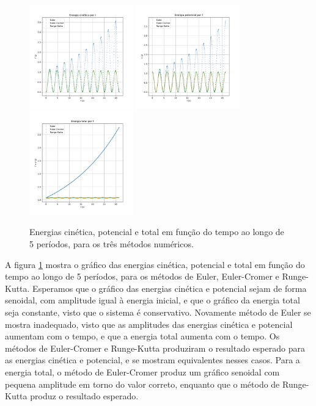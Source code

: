 \documentclass[a4paper, brazil]{article}
\begin{document}
\begin{figure}[ht]
\centering
\includegraphics[width=0.4\textwidth]{fig1c1.pdf}
\includegraphics[width=0.4\textwidth]{fig1c2.pdf}
\includegraphics[width=0.4\textwidth]{fig1c3.pdf}
\caption{Energias cinética, potencial e total em função do tempo ao longo de 5 períodos, para os três métodos numéricos.}
\label{fig1c}
\end{figure}

A figura \ref{fig1c} mostra o gráfico das energias cinética, potencial e total em função do tempo ao longo de 5 períodos, para os métodos de Euler, Euler-Cromer e Runge-Kutta.
Esperamos que o gráfico das energias cinética e potencial sejam de forma senoidal, com amplitude igual à energia inicial, e que o gráfico da energia total seja constante, visto que o sistema é conservativo.
Novamente método de Euler se mostra inadequado, visto que as amplitudes das energias cinética e potencial aumentam com o tempo, e que a energia total aumenta com o tempo.
Os métodos de Euler-Cromer e Runge-Kutta produziram o resultado esperado para as energias cinética e potencial, e se mostram equivalentes nesses casos.
Para a energia total, o método de Euler-Cromer produz um gráfico senoidal com pequena amplitude em torno do valor correto, enquanto que o método de Runge-Kutta produz o resultado esperado.
\end{document}
